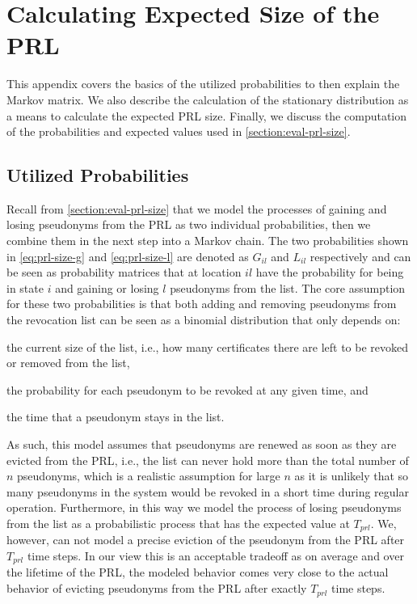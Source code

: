 \section{Calculating Expected Size of the PRL}
\label{appendix:markov}

This appendix covers the basics of the utilized probabilities to then explain
the Markov matrix. We also describe the calculation of the stationary
distribution as a means to calculate the expected \ac{PRL} size. Finally, we
discuss the computation of the probabilities and expected values used in
\cref{section:eval-prl-size}.

\subsection{Utilized Probabilities}

Recall from \cref{section:eval-prl-size} that we model the processes of gaining
and losing pseudonyms from the \ac{PRL} as two individual probabilities, then we
combine them in the next step into a Markov chain. The two probabilities shown
in \cref{eq:prl-size-g} and \cref{eq:prl-size-l} are denoted as $G_{il}$ and
$L_{il}$ respectively and can be seen as probability matrices that at location
$il$ have the probability for being in state $i$ and gaining or losing $l$
pseudonyms from the list. The core assumption for these two probabilities is
that both adding and removing pseudonyms from the revocation list can be seen as
a binomial distribution that only depends on:
\begin{inparaenum}
    \item the current size of the list, i.e., how many certificates there are left to be revoked or removed from the list,
    \item the probability for each pseudonym to be revoked at any given time, and
    \item the time that a pseudonym stays in the list.
\end{inparaenum}
As such, this model assumes that pseudonyms are renewed as soon as they are
evicted from the \ac{PRL}, i.e., the list can never hold more than the total
number of $n$ pseudonyms, which is a realistic assumption for large $n$ as it is
unlikely that so many pseudonyms in the system would be revoked in a short time
during regular operation.  Furthermore, in this way we model the process of
losing pseudonyms from the list as a probabilistic process that has the expected
value at $T_{prl}$.  We, however, can not model a precise eviction of the
pseudonym from the \ac{PRL} after $T_{prl}$ time steps.  In our view this is an
acceptable tradeoff as on average and over the lifetime of the \ac{PRL}, the
modeled behavior comes very close to the actual behavior of evicting pseudonyms
from the \ac{PRL} after exactly $T_{prl}$ time steps.


